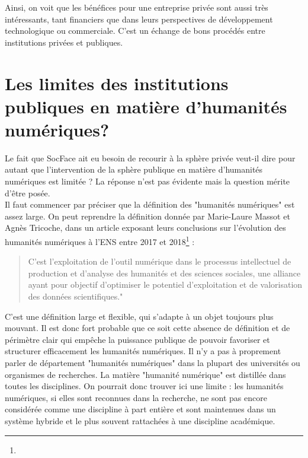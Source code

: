 Ainsi, on voit que les bénéfices pour une entreprise privée sont aussi très intéressants, tant financiers que dans leurs perspectives de développement technologique ou commerciale. C’est un échange de bons procédés entre institutions privées et publiques.  

\section{Les limites des institutions publiques en matière d'humanités numériques?}

Le fait que SocFace ait eu besoin de recourir à la sphère privée veut-il dire pour autant que l’intervention de la sphère publique en matière d’humanités numériques est limitée ? La réponse n’est pas évidente mais la question mérite d’être posée.\\

Il faut commencer par préciser que la définition des "humanités numériques" est assez large. On peut reprendre la définition donnée par Marie-Laure Massot et Agnès Tricoche, dans un article exposant leurs conclusions sur l’évolution des humanités numériques à l’ENS entre 2017 et 2018\footnote{} : 

\begin{quote}
C'est l'exploitation de l'outil numérique dans le processus intellectuel de production et d'analyse des humanités et des sciences sociales, une alliance ayant pour objectif d’optimiser le potentiel d’exploitation et de valorisation des données scientifiques."
\end{quote}   

C’est une définition large et flexible, qui s’adapte à un objet toujours plus mouvant. Il est donc fort probable que ce soit cette absence de définition et de périmètre clair qui empêche la puissance publique de pouvoir favoriser et structurer efficacement les humanités numériques. Il n’y a pas à proprement parler de département "humanités numériques" dans la plupart des universités ou organismes de recherches. La matière "humanité numérique" est distillée dans toutes les disciplines. On pourrait donc trouver ici une limite : les humanités numériques, si elles sont reconnues dans la recherche, ne sont pas encore considérée comme une discipline à part entière et sont maintenues dans un système hybride et le plus souvent rattachées à une discipline académique. 
	
